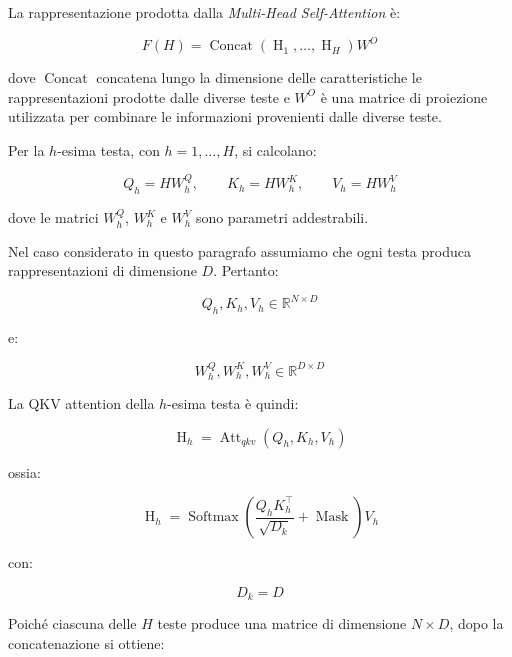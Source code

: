 La rappresentazione prodotta dalla \textit{Multi-Head Self-Attention} è:

\begin{equation}
F(H)
=
\operatorname{Concat}
\left(
\operatorname{H}_1,
\ldots,
\operatorname{H}_H
\right)W^O
\end{equation}

dove $\operatorname{Concat}$ concatena lungo la dimensione delle caratteristiche le rappresentazioni prodotte dalle diverse teste e $W^O$ è una matrice di proiezione utilizzata per combinare le informazioni provenienti dalle diverse teste.

Per la $h$-esima testa, con $h=1,\ldots,H$, si calcolano:

\begin{equation}
Q_h = HW_h^Q,
\qquad
K_h = HW_h^K,
\qquad
V_h = HW_h^V
\end{equation}

dove le matrici $W_h^Q$, $W_h^K$ e $W_h^V$ sono parametri addestrabili.

Nel caso considerato in questo paragrafo assumiamo che ogni testa produca rappresentazioni di dimensione $D$. Pertanto:

\begin{equation}
Q_h,K_h,V_h\in\mathbb{R}^{N\times D}
\end{equation}

e:

\begin{equation}
W_h^Q,W_h^K,W_h^V\in\mathbb{R}^{D\times D}
\end{equation}

La QKV attention della $h$-esima testa è quindi:

\begin{equation}
\operatorname{H}_h
=
\operatorname{Att}_{qkv}
(Q_h,K_h,V_h)
\end{equation}

ossia:

\begin{equation}
\operatorname{H}_h
=
\operatorname{Softmax}
\left(
\frac{Q_hK_h^\top}{\sqrt{D_k}}
+
\operatorname{Mask}
\right)V_h
\end{equation}

con:

\begin{equation}
D_k=D
\end{equation}

Poiché ciascuna delle $H$ teste produce una matrice di dimensione $N\times D$, dopo la concatenazione si ottiene:

